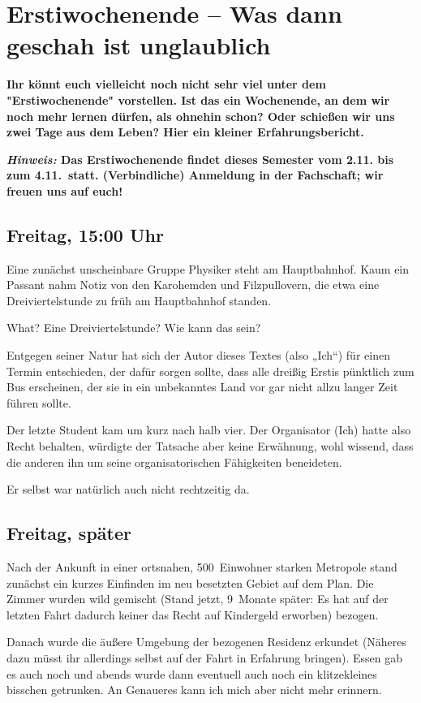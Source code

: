 \section{Erstiwochenende -- Was dann geschah ist unglaublich}
\textbf{Ihr könnt euch vielleicht noch nicht sehr viel unter dem "Erstiwochenende" vorstellen.
	Ist das ein Wochenende, an dem wir noch mehr lernen dürfen, als ohnehin schon?
	Oder schießen wir uns zwei Tage aus dem Leben?
	Hier ein kleiner Erfahrungsbericht.}

\textbf{\emph{Hinweis:}
	Das Erstiwochenende findet dieses Semester vom 2.11. bis zum 4.11.\ statt. (Verbindliche) Anmeldung in der Fachschaft; wir freuen uns auf euch!}
\begin{multicols*}{2}
\subsection{Freitag, 15:00 Uhr}
Eine zunächst unscheinbare Gruppe Physiker steht am Hauptbahnhof.
Kaum ein Passant nahm Notiz von den Karohemden und Filzpullovern, die etwa eine Dreiviertelstunde zu früh am Hauptbahnhof standen.

What?
Eine Dreiviertelstunde?
Wie kann das sein?

Entgegen seiner Natur hat sich der Autor dieses Textes (also „Ich“) für einen Termin entschieden, der dafür sorgen sollte, dass alle dreißig Erstis pünktlich zum Bus erscheinen, der sie in ein unbekanntes Land vor gar nicht allzu langer Zeit führen sollte.

Der letzte Student kam um kurz nach halb vier.
Der Organisator (Ich) hatte also Recht behalten, würdigte der Tatsache aber keine Erwähnung, wohl wissend, dass die anderen ihn um seine organisatorischen Fähigkeiten beneideten.

Er selbst war natürlich auch nicht rechtzeitig da.

\subsection{Freitag, später}
Nach der Ankunft in einer ortsnahen, 500~Einwohner starken Metropole stand zunächst ein kurzes Einfinden im neu besetzten Gebiet auf dem Plan.
Die Zimmer wurden wild gemischt (Stand jetzt, 9~Monate später: Es hat auf der letzten Fahrt dadurch keiner das Recht auf Kindergeld erworben) bezogen.

Danach wurde die äußere Umgebung der bezogenen Residenz erkundet (Näheres dazu müsst ihr allerdings selbst auf der Fahrt in Erfahrung bringen).
Essen gab es auch noch und abends wurde dann eventuell auch noch ein klitzekleines bisschen getrunken.
An Genaueres kann ich mich aber nicht mehr erinnern.


\end{multicols*}

